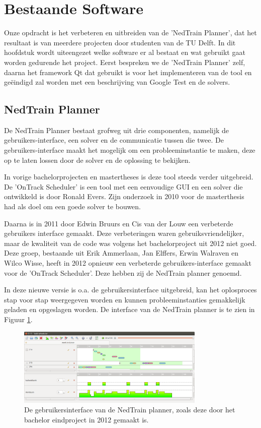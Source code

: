 \section{Bestaande Software}
Onze opdracht is het verbeteren en uitbreiden van de 'NedTrain Planner', dat het resultaat is van meerdere projecten door studenten van de TU Delft. In dit hoofdstuk wordt uiteengezet welke software er al bestaat en wat gebruikt gaat worden gedurende het project. Eerst bespreken we de 'NedTrain Planner' zelf, daarna het framework Qt dat gebruikt is voor het implementeren van de tool en ge\"eindigd zal worden met een beschrijving van Google Test en de solvers.

\subsection{NedTrain Planner}
\label{subsec:planner}
De NedTrain Planner bestaat grofweg uit drie componenten, namelijk de gebruikers-interface, een solver en de communicatie tussen die twee. De gebruikers-interface maakt het mogelijk om een probleeminstantie te maken, deze op te laten lossen door de solver en de oplossing te bekijken.

In vorige bachelorprojecten en mastertheses is deze tool steeds verder uitgebreid. De 'OnTrack Scheduler' is een tool met een eenvoudige GUI en een solver die ontwikkeld is door Ronald Evers. Zijn onderzoek in 2010 voor de masterthesis had als doel om een goede solver te bouwen. \cite{ronaldevers2010}

Daarna is in 2011 door Edwin Bruurs en Cis van der Louw een verbeterde gebruikers interface gemaakt.\cite{bep2011nedtrain} Deze verbeteringen waren gebruiksvriendelijker, maar de kwaliteit van de code was volgens het bachelorproject uit 2012 niet goed.\cite{bep2012nedtrain} Deze groep, bestaande uit Erik Ammerlaan, Jan Elffers, Erwin Walraven en Wilco Wisse, heeft in 2012 opnieuw een verbeterde gebruikers-interface gemaakt voor de 'OnTrack Scheduler'. Deze hebben zij de NedTrain planner genoemd.

In deze nieuwe versie is o.a. de gebruikersinterface uitgebreid, kan het oplosproces stap voor stap weergegeven worden en kunnen probleeminstanties gemakkelijk geladen en opgeslagen worden. De interface van de NedTrain planner is te zien in Figuur \ref{fig:plannergui}.

\begin{figure}[!h]
\label{fig:plannergui}
\centering
\includegraphics[width=0.8\textwidth]{../images/plannergui.png}
\caption{De gebruikersinterface van de NedTrain planner, zoals deze door het bachelor eindproject in 2012 gemaakt is.}
\end{figure}

